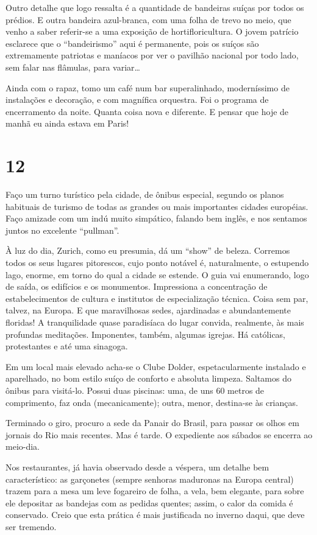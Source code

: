 Outro detalhe que logo ressalta é a quantidade de bandeiras suíças por todos os prédios. E outra bandeira azul-branca, com uma folha de trevo no meio, que venho a saber referir-se a uma exposição de hortifloricultura. O jovem patrício esclarece que o “bandeirismo” aqui é permanente, pois os suíços são extremamente patriotas e maníacos por ver o pavilhão nacional por todo lado, sem falar nas flâmulas, para variar\ldots

Ainda com o rapaz, tomo um café num bar superalinhado, moderníssimo de instalações e decoração, e com magnífica orquestra. Foi o programa de encerramento da noite. Quanta coisa nova e diferente. E pensar que hoje de manhã eu ainda estava em Paris!

\section*{12 \adfflatleafright {}}
Faço um turno turístico pela cidade, de ônibus especial, segundo os planos habituais de turismo de todas as grandes ou mais importantes cidades européias. Faço amizade com um indú muito simpático, falando bem inglês, e nos sentamos juntos no excelente “pullman”.

À luz do dia, Zurich, como eu presumia, dá um “show” de beleza. Corremos todos os seus lugares pitorescos, cujo ponto notável é, naturalmente, o estupendo lago, enorme, em torno do qual a cidade se estende. O guia vai enumerando, logo de saída, os edifícios e os monumentos. Impressiona a concentração de estabelecimentos de cultura e institutos de especialização técnica. Coisa sem par, talvez, na Europa. E que maravilhosas sedes, ajardinadas e abundantemente floridas! A tranquilidade quase paradisíaca do lugar convida, realmente, às mais profundas meditações. Imponentes, também, algumas igrejas. Há católicas, protestantes e até uma sinagoga.

Em um local mais elevado acha-se o Clube Dolder, espetacularmente instalado e aparelhado, no bom estilo suíço de conforto e absoluta limpeza. Saltamos do ônibus para visitá-lo. Possui duas piscinas: uma, de uns 60 metros de comprimento, faz onda (mecanicamente); outra, menor, destina-se às crianças.

Terminado o giro, procuro a sede da Panair do Brasil, para passar os olhos em jornais do Rio mais recentes. Mas é tarde. O expediente aos sábados se encerra ao meio-dia.

Nos restaurantes, já havia observado desde a véspera, um detalhe bem característico: as garçonetes (sempre senhoras maduronas na Europa central) trazem para a mesa um leve fogareiro de folha, a vela, bem elegante, para sobre ele depositar as bandejas com as pedidas quentes; assim, o calor da comida é conservado. Creio que esta prática é mais justificada no inverno daqui, que deve ser tremendo.

